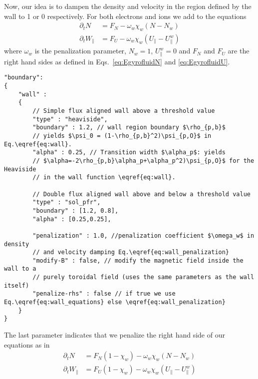 Now, our idea is to dampen the density and velocity in the region defined by the
wall to 1 or 0 respectively.
For both electrons and ions we add to the equations
\begin{subequations} \label{eq:wall_penalization}
\begin{align}
    \partial_t N &= F_N -\omega_w\chi_w (N-N_w)\\
    \partial_t W_\parallel &= F_U -\omega_w\chi_w (U_\parallel-U_\parallel^w)
\end{align}
\end{subequations}
where $\omega_w$ is the penalization parameter, $N_w = 1$, $U_\parallel^w = 0$ and $F_N$ and $F_U$ are the
right hand sides as defined in Eqs.~\eqref{eq:EgyrofluidN} and \eqref{eq:EgyrofluidU}.
\begin{verbatim}
"boundary":
{
    "wall" :
    {
        // Simple flux aligned wall above a threshold value
        "type" : "heaviside",
        "boundary" : 1.2, // wall region boundary $\rho_{p,b}$
        // yields $\psi_0 = (1-\rho_{p,b}^2)\psi_{p,O}$ in Eq.\eqref{eq:wall}.
        "alpha" : 0.25, // Transition width $\alpha_p$: yields
        // $\alpha=-2\rho_{p,b}\alpha_p+\alpha_p^2)\psi_{p,O}$ for the Heaviside
        // in the wall function \eqref{eq:wall}.

        // Double flux aligned wall above and below a threshold value
        "type" : "sol_pfr",
        "boundary" : [1.2, 0.8],
        "alpha" : [0.25,0.25],

        "penalization" : 1.0, //penalization coefficient $\omega_w$ in density
        // and velocity damping Eq.\eqref{eq:wall_penalization}
        "modify-B" : false, // modify the magnetic field inside the wall to a
        // purely toroidal field (uses the same parameters as the wall itself)
        "penalize-rhs" : false // if true we use Eq.\eqref{eq:wall_equations} else \eqref{eq:wall_penalization}
    }
}
\end{verbatim}
\noindent
The last parameter indicates that we penalize the right hand side of our equations
as in
\begin{subequations} \label{eq:wall_equations}
\begin{align}
    \partial_t N &= F_N ( 1-\chi_w) -\omega_w\chi_w (N-N_w)\\
    \partial_t W_\parallel &= F_U ( 1 - \chi_w) -\omega_w\chi_w (U_\parallel-U_\parallel^w)
\end{align}
\end{subequations}

